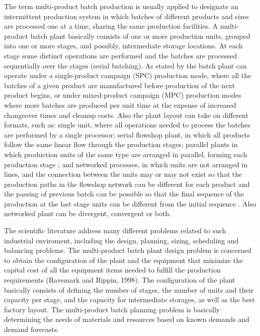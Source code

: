 \documentclass[authoryear,manuscript,12pt]{elsarticle}
\begin{document}
The term multi-product batch production is usually applied to designate an intermittent production system in which batches of different products and sizes are processed one at a time, sharing the same production facilities. A multi-product batch plant basically consists of one or more production units, grouped into one or more stages, and possibly, intermediate storage locations. At each stage some distinct operations are performed and the batches are processed sequentially over the stages (serial batching). As stated by \cite{PetkovMaranas1998} the batch plant can operate under a single-product campaign (SPC) production mode, where all the batches of a given product are manufactured before production of the next product begins, or under mixed-product campaign (MPC) production modes where more batches are produced per unit time at the expense of increased changeover times and cleanup costs. Also the plant layout can take on different formats, such as: single unit, where all operations needed to process the batches are performed by a single processor; serial flowshop plant, in which all products follow the same linear flow through the production stages; parallel plants in which production units of the same type are arranged in parallel, forming each production stage \citep{ShiEtAll2017}; and networked processes, in which units are not arranged in lines, and the connection between the units may or may not exist so that the production paths in the flowshop network can be different for each product and the passing of previous batch can be possible so that the final sequence of the production at the last stage units can be different from the initial sequence \citep{KimEtAl1996}. Also networked plant can be divergent, convergent or both.

The scientific literature address many different problems related to such industrial enviroment, including the design, planning, sizing, scheduling and balancing problems. The multi-product batch plant design problem is concerned to obtain the configuration of the plant and the equipment that minimize the capital cost of all the equipment items needed to fulfill the production requirements (Ravemark and Rippin, 1998). The configuration of the plant basically consists of defining the number of stages, the number of units and their capacity per stage, and the capacity for intermediate storages, as well as the best factory layout. The multi-product batch planning problem is basically determining the needs of materials and resources based on known demands and demand forecasts. 
\end{document}
